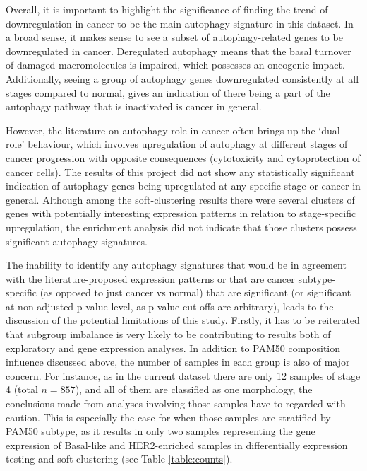Overall, it is important to highlight the significance of finding the trend of downregulation in cancer to be the main autophagy signature in this dataset. In a broad sense, it makes sense to see a subset of  autophagy-related genes to be downregulated in cancer. Deregulated autophagy means that the basal turnover of damaged macromolecules is impaired, which possesses an oncogenic impact. Additionally, seeing a group of autophagy genes downregulated consistently at all stages compared to normal, gives an indication of there being a part of the autophagy pathway that is inactivated is cancer in general. %

However, the literature on autophagy role in cancer often brings up the ‘dual role’ behaviour, which involves upregulation of  autophagy at different stages of cancer progression with opposite consequences (cytotoxicity and cytoprotection of cancer cells). The results of this project did not show any statistically significant indication of autophagy genes being upregulated at any specific stage or cancer in general. Although among the soft-clustering results there were several clusters of genes with potentially interesting expression patterns in relation to stage-specific upregulation,  the enrichment analysis did not indicate that those clusters possess significant autophagy signatures.

The inability to identify any autophagy signatures that would be in agreement with the literature-proposed expression patterns or that are cancer subtype-specific (as opposed to just cancer vs normal) that are significant (or significant at non-adjusted p-value level, as p-value cut-offs are arbitrary), leads to the discussion of the potential limitations of this study.
Firstly, it has to be reiterated that subgroup imbalance is very likely to be contributing to results both of exploratory and gene expression analyses. In addition to PAM50 composition influence discussed above, the number of samples in each  group is also of major concern. For instance, as in the current dataset there are only 12 samples of stage 4 (total $n=857$), and all of them are classified as one morphology, the conclusions made from analyses involving those samples have to regarded with caution. This is especially the case for when those samples are stratified by PAM50 subtype, as it results in only two samples representing the gene expression of Basal-like and HER2-enriched samples in differentially expression testing and soft clustering (see Table \ref{table:counts}). 

